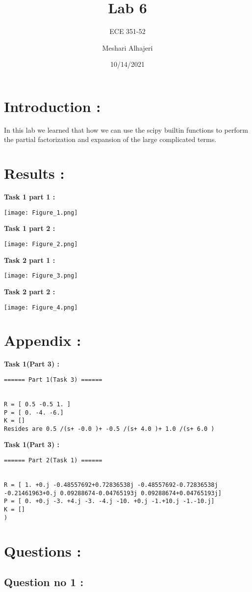 \documentclass[11pt]{article}
\title{Lab 6}
\author{ECE 351-52}
\author{Meshari Alhajeri}
\date{10/14/2021}
\begin{document}
\maketitle
\section{Introduction :}
In this lab we learned that how we can use the scipy builtin functions to perform the partial factorization and expansion of the large complicated terms.
\section{Results :}


\textbf{Task 1 part 1 :}
\begin{center}
\texttt{[image: Figure\_1.png]}
\end{center}

\textbf{Task 1 part 2 :}
\begin{center}
\texttt{[image: Figure\_2.png]}
\end{center}

\textbf{Task 2 part 1 :}
\begin{center}
\texttt{[image: Figure\_3.png]}
\end{center}

\textbf{Task 2 part 2 :}
\begin{center}
\texttt{[image: Figure\_4.png]}
\end{center}


\section{Appendix :}\label{section-introduction}
{\bf Task 1(Part 3) :}
\begin{lstlisting}
====== Part 1(Task 3) ======


R = [ 0.5 -0.5 1. ] 
P = [ 0. -4. -6.] 
K = [] 
Resides are 0.5 /(s+ -0.0 )+ -0.5 /(s+ 4.0 )+ 1.0 /(s+ 6.0 )
\end{lstlisting}
{\bf Task 1(Part 3) :}
\begin{lstlisting}
====== Part 2(Task 1) ======


R = [ 1. +0.j -0.48557692+0.72836538j -0.48557692-0.72836538j
-0.21461963+0.j 0.09288674-0.04765193j 0.09288674+0.04765193j] 
P = [ 0. +0.j -3. +4.j -3. -4.j -10. +0.j -1.+10.j -1.-10.j] 
K = [] 
)
\end{lstlisting}

\section{Questions :}
{\subsection{Question no 1 :} }
\end{document}
